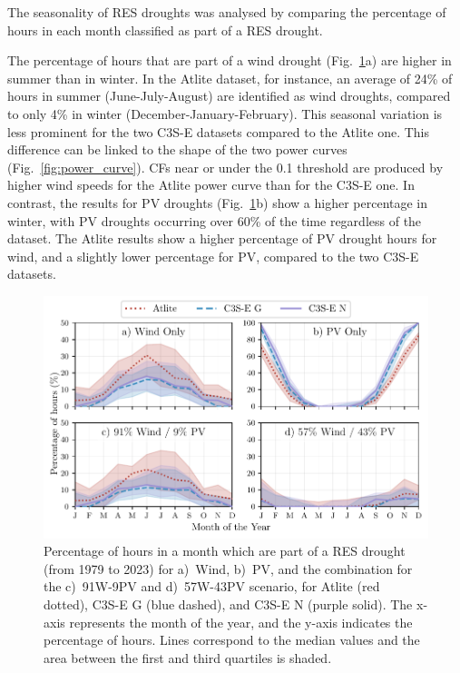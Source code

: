 \documentclass[preprint, 12pt]{elsarticle}
\begin{document}
The seasonality of RES droughts was analysed by comparing the percentage of hours in each month classified as part of a RES drought. 

The percentage of hours that are part of a wind drought (Fig.~\ref{fig:res_droughts_seasonality}a) are higher in summer than in winter. In the Atlite dataset, for instance, an average of 24\% of hours in summer (June-July-August) are identified as wind droughts, compared to only 4\% in winter (December-January-February). This seasonal variation is less prominent for the two C3S-E datasets compared to the Atlite one. This difference can be linked to the shape of the two power curves (Fig.~\ref{fig:power_curve}). CFs near or under the 0.1 threshold are produced by higher wind speeds for the Atlite power curve than for the C3S-E one. In contrast, the results for PV droughts (Fig.~\ref{fig:res_droughts_seasonality}b) show a higher percentage in winter, with PV droughts occurring over 60\% of the time regardless of the dataset. The Atlite results show a higher percentage of PV drought hours for wind, and a slightly lower percentage for PV, compared to the two C3S-E datasets. 

\begin{figure}[!ht]
	\centering
	\includegraphics[width=\textwidth]{droughts_seasonality.pdf}
	\caption{Percentage of hours in a month which are part of a RES drought (from 1979 to 2023) for a)~Wind, b)~PV, and the combination for the c)~91W-9PV and d)~57W-43PV scenario, for Atlite (red dotted), C3S-E G (blue dashed), and C3S-E N (purple solid). The x-axis represents the month of the year, and the y-axis indicates the percentage of hours. Lines correspond to the median values and the area between the first and third quartiles is shaded.}
	\label{fig:res_droughts_seasonality}
\end{figure}
\end{document}
